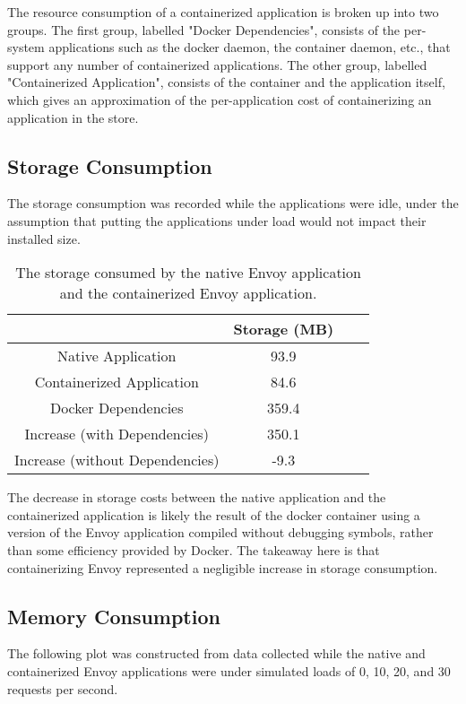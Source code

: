 \documentclass{article}
\begin{document}
The resource consumption of a containerized application is broken up into two groups. The first group, labelled "Docker Dependencies", consists of the per-system applications such as the docker daemon, the container daemon, etc., that support any number of containerized applications. The other group, labelled "Containerized Application", consists of the container and the application itself, which gives an approximation of the per-application cost of containerizing an application in the store.

\subsection{Storage Consumption}
The storage consumption was recorded while the applications were idle, under the assumption that putting the applications under load would not impact their installed size.

\begin{table}[H]
\begin{tabular}{ |c|c|c|c| }
 \hline
   & Storage (MB)\\ 
 \hline
 Native Application & 93.9 \\
 \hline
 Containerized Application & 84.6 \\
 \hline
 Docker Dependencies & 359.4\\
 \hline\hline
 Increase (with Dependencies) & 350.1 \\
 \hline
 Increase (without Dependencies) & -9.3 \\
 \hline
\end{tabular}
\caption{The storage consumed by the native Envoy application and the containerized Envoy application.}
\label{storage-consumption}
\end{table}

The decrease in storage costs between the native application and the containerized application is likely the result of the docker container using a version of the Envoy application compiled without debugging symbols, rather than some efficiency provided by Docker. The takeaway here is that containerizing Envoy represented a negligible increase in storage consumption.

\subsection{Memory Consumption}
The following plot was constructed from data collected while the native and containerized Envoy applications were under simulated loads of 0, 10, 20, and 30 requests per second.
\end{document}
